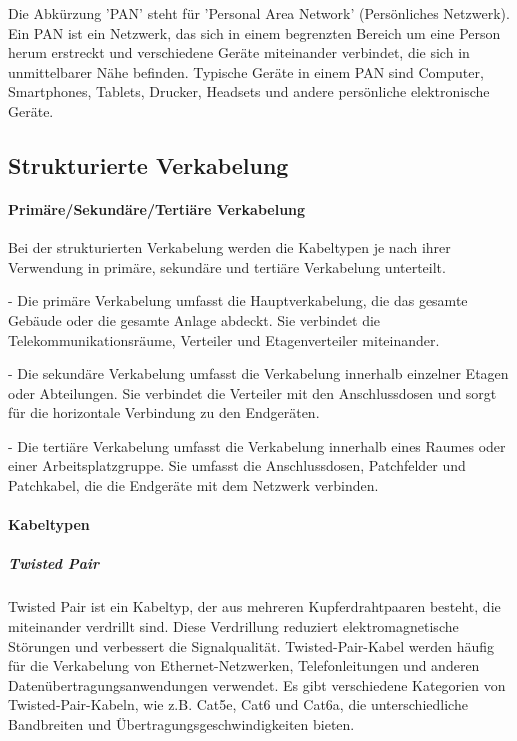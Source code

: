 Die Abkürzung 'PAN' steht für 'Personal Area Network' (Persönliches Netzwerk). Ein PAN ist ein Netzwerk, das sich in einem begrenzten Bereich um eine Person herum erstreckt und verschiedene Geräte miteinander verbindet, die sich in unmittelbarer Nähe befinden. Typische Geräte in einem PAN sind Computer, Smartphones, Tablets, Drucker, Headsets und andere persönliche elektronische Geräte.

\subsection{Strukturierte Verkabelung}

\paragraph{Primäre/Sekundäre/Tertiäre Verkabelung}

Bei der strukturierten Verkabelung werden die Kabeltypen je nach ihrer Verwendung in primäre, sekundäre und tertiäre Verkabelung unterteilt.

- Die primäre Verkabelung umfasst die Hauptverkabelung, die das gesamte Gebäude oder die gesamte Anlage abdeckt. Sie verbindet die Telekommunikationsräume, Verteiler und Etagenverteiler miteinander.

- Die sekundäre Verkabelung umfasst die Verkabelung innerhalb einzelner Etagen oder Abteilungen. Sie verbindet die Verteiler mit den Anschlussdosen und sorgt für die horizontale Verbindung zu den Endgeräten.

- Die tertiäre Verkabelung umfasst die Verkabelung innerhalb eines Raumes oder einer Arbeitsplatzgruppe. Sie umfasst die Anschlussdosen, Patchfelder und Patchkabel, die die Endgeräte mit dem Netzwerk verbinden.

\paragraph{Kabeltypen}

\subparagraph{Twisted Pair}

Twisted Pair ist ein Kabeltyp, der aus mehreren Kupferdrahtpaaren besteht, die miteinander verdrillt sind. Diese Verdrillung reduziert elektromagnetische Störungen und verbessert die Signalqualität. Twisted-Pair-Kabel werden häufig für die Verkabelung von Ethernet-Netzwerken, Telefonleitungen und anderen Datenübertragungsanwendungen verwendet. Es gibt verschiedene Kategorien von Twisted-Pair-Kabeln, wie z.B. Cat5e, Cat6 und Cat6a, die unterschiedliche Bandbreiten und Übertragungsgeschwindigkeiten bieten.

